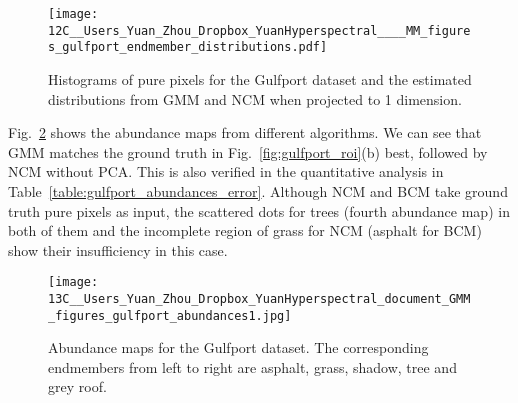 \documentclass[twocolumn,english]{IEEEtran}
\theoremstyle{plain}
\begin{document}
\begin{figure}
\begin{centering}
\texttt{[image: 12C\_\_Users\_Yuan\_Zhou\_Dropbox\_YuanHyperspectral\_\_\_\_MM\_figures\_gulfport\_endmember\_distributions.pdf]}
\par\end{centering}
\caption{Histograms of pure pixels for the Gulfport dataset and the estimated
distributions from GMM and NCM when projected to 1 dimension.}

\label{fig:gulfport_histogram}
\end{figure}

Fig.~\ref{fig:gulfport_abundances} shows the abundance maps from
different algorithms. We can see that GMM matches the ground truth
in Fig.~\ref{fig:gulfport_roi}(b) best, followed by NCM without
PCA. This is also verified in the quantitative analysis in Table~\ref{table:gulfport_abundances_error}.
Although NCM and BCM take ground truth pure pixels as input, the scattered
dots for trees (fourth abundance map) in both of them and the incomplete
region of grass for NCM (asphalt for BCM) show their insufficiency
in this case.

\begin{figure}
\begin{centering}
\texttt{[image: 13C\_\_Users\_Yuan\_Zhou\_Dropbox\_YuanHyperspectral\_document\_GMM\_figures\_gulfport\_abundances1.jpg]}
\par\end{centering}
\caption{Abundance maps for the Gulfport dataset. The corresponding endmembers
from left to right are asphalt, grass, shadow, tree and grey roof.}

\label{fig:gulfport_abundances}
\end{figure}
\end{document}
